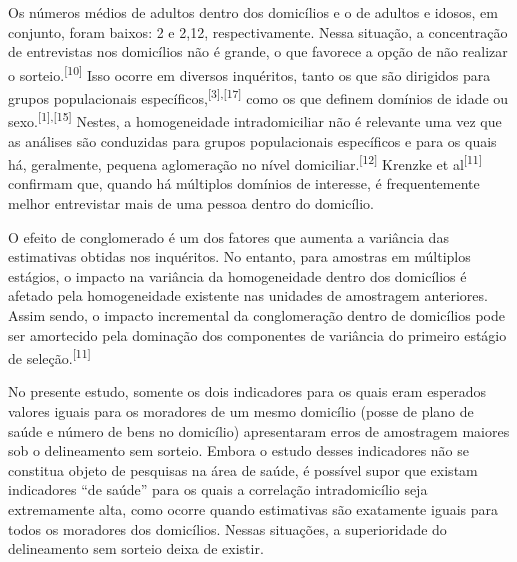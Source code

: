 \documentclass{article}
\begin{document}
Os números médios de adultos dentro dos domicílios e o de adultos e idosos, em
conjunto, foram baixos: 2 e 2,12, respectivamente. Nessa situação, a
concentração de entrevistas nos domicílios não é grande, o que favorece a opção
de não realizar o sorteio.\textsuperscript{[}\textsuperscript{10}\textsuperscript{]}
Isso ocorre em diversos inquéritos, tanto os que são dirigidos para grupos
populacionais específicos,\textsuperscript{[}\textsuperscript{3}\textsuperscript{]}\textsuperscript{,}\textsuperscript{[}\textsuperscript{17}\textsuperscript{]}
como os que definem domínios de idade ou
sexo.\textsuperscript{[}\textsuperscript{1}\textsuperscript{]}\textsuperscript{,}\textsuperscript{[}\textsuperscript{15}\textsuperscript{]}
Nestes, a homogeneidade intradomiciliar não é relevante uma vez que as análises
são conduzidas para grupos populacionais específicos e para os quais há,
geralmente, pequena aglomeração no nível
domiciliar.\textsuperscript{[}\textsuperscript{12}\textsuperscript{]}
Krenzke et al\textsuperscript{[}\textsuperscript{11}\textsuperscript{]}
confirmam que, quando há múltiplos domínios de interesse, é frequentemente
melhor entrevistar mais de uma pessoa dentro do domicílio.

O efeito de conglomerado é um dos fatores que aumenta a variância das
estimativas obtidas nos inquéritos. No entanto, para amostras em múltiplos
estágios, o impacto na variância da homogeneidade dentro dos domicílios é
afetado pela homogeneidade existente nas unidades de amostragem anteriores.
Assim sendo, o impacto incremental da conglomeração dentro de domicílios pode
ser amortecido pela dominação dos componentes de variância do primeiro estágio
de seleção.\textsuperscript{[}\textsuperscript{11}\textsuperscript{]}

No presente estudo, somente os dois indicadores para os quais eram esperados
valores iguais para os moradores de um mesmo domicílio (posse de plano de saúde
e número de bens no domicílio) apresentaram erros de amostragem maiores sob o
delineamento sem sorteio. Embora o estudo desses indicadores não se constitua
objeto de pesquisas na área de saúde, é possível supor que existam indicadores
“de saúde” para os quais a correlação intradomicílio seja extremamente alta,
como ocorre quando estimativas são exatamente iguais para todos os moradores dos
domicílios. Nessas situações, a superioridade do delineamento sem sorteio deixa
de existir.
\end{document}

